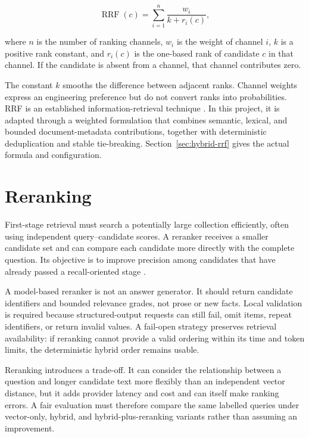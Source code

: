 \begin{equation}
    \operatorname{RRF}(c) =
    \sum_{i=1}^{n}\frac{w_i}{k+r_i(c)},
    \label{eq:generic-rrf}
\end{equation}

where $n$ is the number of ranking channels, $w_i$ is the weight of channel $i$, $k$ is a positive rank constant, and $r_i(c)$ is the one-based rank of candidate $c$ in that channel. If the candidate is absent from a channel, that channel contributes zero.

The constant $k$ smooths the difference between adjacent ranks. Channel weights express an engineering preference but do not convert ranks into probabilities. RRF is an established information-retrieval technique \cite{Cormack2009RRF}. In this project, it is adapted through a weighted formulation that combines semantic, lexical, and bounded document-metadata contributions, together with deterministic deduplication and stable tie-breaking. Section~\ref{sec:hybrid-rrf} gives the actual formula and configuration.

\section{Reranking}
\label{sec:background-reranking}

First-stage retrieval must search a potentially large collection efficiently, often using independent query--candidate scores. A reranker receives a smaller candidate set and can compare each candidate more directly with the complete question. Its objective is to improve precision among candidates that have already passed a recall-oriented stage \cite{Nogueira2019BERT}.

A model-based reranker is not an answer generator. It should return candidate identifiers and bounded relevance grades, not prose or new facts. Local validation is required because structured-output requests can still fail, omit items, repeat identifiers, or return invalid values. A fail-open strategy preserves retrieval availability: if reranking cannot provide a valid ordering within its time and token limits, the deterministic hybrid order remains usable.

Reranking introduces a trade-off. It can consider the relationship between a question and longer candidate text more flexibly than an independent vector distance, but it adds provider latency and cost and can itself make ranking errors. A fair evaluation must therefore compare the same labelled queries under vector-only, hybrid, and hybrid-plus-reranking variants rather than assuming an improvement.

